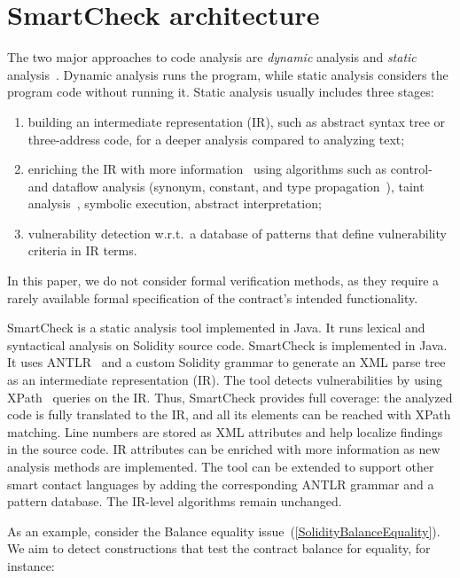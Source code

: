 \section{SmartCheck architecture}

The two major approaches to code analysis are \textit{dynamic} analysis and \textit{static} analysis~\cite{Liu2012}.
Dynamic analysis runs the program, while static analysis considers the program code without running it.
Static analysis usually includes three stages:
\begin{enumerate}
	\item building an intermediate representation (IR), such as abstract syntax tree or three-address code, for a deeper analysis compared to analyzing text;
	\item enriching the IR with more information~\cite{Woegerer2005} using algorithms such as control- and dataflow analysis (synonym, constant, and type propagation~\cite{Aho1986}), taint analysis~\cite{Tripp2009}, symbolic execution, abstract interpretation;
	\item vulnerability detection w.r.t.~a database of patterns that define vulnerability criteria in IR terms.
\end{enumerate}
In this paper, we do not consider formal verification methods, as they require a rarely available formal specification of the contract's intended functionality.

SmartCheck is a static analysis tool implemented in Java.
It runs lexical and syntactical analysis on Solidity source code.
SmartCheck is implemented in Java.
It uses ANTLR~\cite{Parr} and a custom Solidity grammar to generate an XML parse tree~\cite{Aho1986} as an intermediate representation (IR).
The tool detects vulnerabilities by using XPath~\cite{Liu2009} queries on the IR\@.
Thus, SmartCheck provides full coverage: the analyzed code is fully translated to the IR, and all its elements can be reached with XPath matching.
Line numbers are stored as XML attributes and help localize findings in the source code.
IR attributes can be enriched with more information as new analysis methods are implemented.
The tool can be extended to support other smart contact languages by adding the corresponding ANTLR grammar and a pattern database.
The IR-level algorithms remain unchanged.

As an example, consider the Balance equality issue~(\ref{SolidityBalanceEquality}).
We aim to detect constructions that test the contract balance for equality, for instance:

